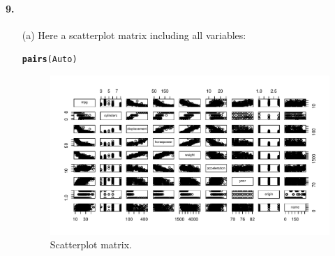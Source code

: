 \documentclass[a4paper, 10pt]{scrartcl}\usepackage[]{graphicx}\usepackage[]{color}
\makeatletter
\def\maxwidth{ %
  \ifdim\Gin@nat@width>\linewidth
    \linewidth
  \else
    \Gin@nat@width
  \fi
}
\newcommand{\hlstd}[1]{\textcolor[rgb]{0.345,0.345,0.345}{#1}}%
\newcommand{\hlkwd}[1]{\textcolor[rgb]{0.737,0.353,0.396}{\textbf{#1}}}%
\newenvironment{kframe}{%
 \def\at@end@of@kframe{}%
 \ifinner\ifhmode%
  \def\at@end@of@kframe{\end{minipage}}%
  \begin{minipage}{\columnwidth}%
 \fi\fi%
 \def\FrameCommand##1{\hskip\@totalleftmargin \hskip-\fboxsep
 \colorbox{shadecolor}{##1}\hskip-\fboxsep
     \hskip-\linewidth \hskip-\@totalleftmargin \hskip\columnwidth}%
 \MakeFramed {\advance\hsize-\width
   \@totalleftmargin\z@ \linewidth\hsize
   \@setminipage}}%
 {\par\unskip\endMakeFramed%
 \at@end@of@kframe}
\newenvironment{knitrout}{}{} %
\makeatother
\begin{document}
\paragraph{9.}
\begin{itemize}
	\item[(a)] Here a scatterplot matrix including all variables:
\begin{knitrout}
\color{fgcolor}\begin{kframe}
\begin{alltt}
\hlkwd{pairs}\hlstd{(Auto)}
\end{alltt}
\end{kframe}\begin{figure}[H]
\includegraphics[width=\maxwidth]{figure/p4b-1} \caption[Scatterplot matrix]{Scatterplot matrix.}\label{fig:p4b}
\end{figure}



\end{knitrout}
\end{itemize}
\end{document}
